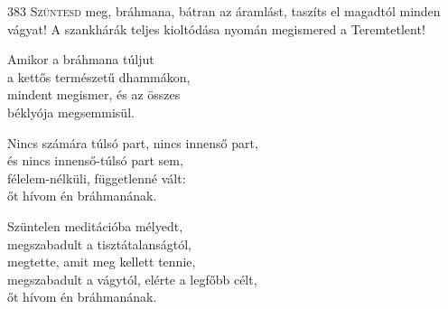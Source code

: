 
\vspace*{-\baselineskip}

\begin{firstdhpverse}[-2pt]{383}
\lettrine{S}{züntesd} {\LettrineTextFont meg, bráhmana, bátran az áramlást,}\newline
taszíts el magadtól minden vágyat!\newline
A szankhárák teljes kioltódása nyomán\newline
megismered a Teremtetlent!
\end{firstdhpverse}

\begin{dhpverse}

 Amikor a bráhmana túljut\\
a kettős természetű dhammákon,\\
mindent megismer, és az összes\\
béklyója megsemmisül.

 Nincs számára túlsó part, nincs innenső part,\\
és nincs innenső-túlsó part sem,\\
félelem-nélküli, függetlenné vált:\\
őt hívom én bráhmanának.

 Szüntelen meditációba mélyedt,\\
megszabadult a tisztátalanságtól,\\
megtette, amit meg kellett tennie,\\
megszabadult a vágytól, elérte a legfőbb célt,\\
őt hívom én bráhmanának.

\end{dhpverse}
\newpage
